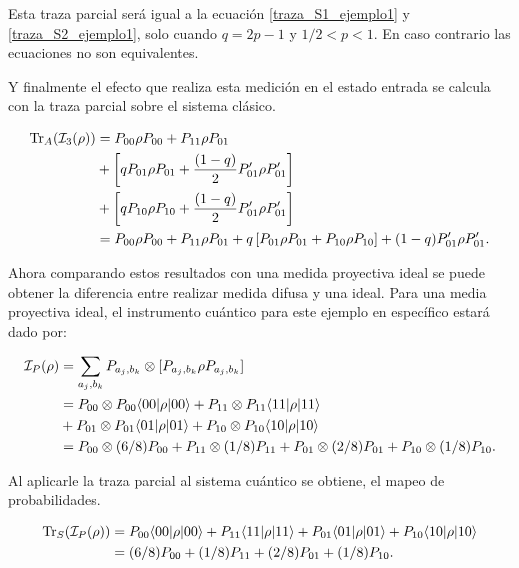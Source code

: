 Esta traza parcial será igual a la ecuación {\ref{traza_S1_ejemplo1}} y {\ref{traza_S2_ejemplo1}}, solo cuando $q=2p-1$ y $1/2<p<1$. En caso contrario las ecuaciones no son equivalentes. 

Y finalmente el efecto que realiza esta medición en el estado entrada se calcula con la traza parcial sobre el sistema clásico.


\begin{equation}\label{traza_A3_ejemplo1}
    \begin{split}
        {\rm Tr}_A(\mathcal{I}_3(\rho)) &=P_{00} \rho P_{00} + P_{11} \rho P_{01}\\
        &+\left[qP_{01}\rho P_{01}+ \frac{(1-q)}{2} P'_{01}\rho P'_{01}\right] \\
        &+\left[qP_{10}\rho P_{10}+ \frac{(1-q)}{2} P'_{01}\rho P'_{01}\right]\\
        &=P_{00} \rho P_{00} + P_{11} \rho P_{01}+q\left[P_{01}\rho P_{01}+ P_{10}\rho P_{10}\right]+{(1-q)} P'_{01}\rho P'_{01}.\\
    \end{split}
\end{equation}



Ahora comparando estos resultados con una medida proyectiva ideal se puede obtener la diferencia entre realizar medida difusa y una ideal. Para una media proyectiva ideal, el instrumento cuántico para este ejemplo en específico estará dado por:


\begin{equation}\label{proyectiva_ideal_ejemplo}
    \begin{split}
        \mathcal{I}_P(\rho)&=\sum_{a_j,b_k}P_{a_j,b_k}\otimes[P_{a_j,b_k}\rho P_{a_j,b_k}]\\
        &=P_{00}\otimes P_{00} \langle 00|\rho|00\rangle + P_{11}\otimes P_{11} \langle 11|\rho|11\rangle\\
        &+P_{01} \otimes P_{01}\langle 01|\rho|01\rangle +P_{10} \otimes P_{10} \langle 10|\rho|10\rangle\\
        &=P_{00}\otimes (6/8)P_{00} + P_{11}\otimes (1/8)P_{11}+P_{01} \otimes (2/8)P_{01} +P_{10} \otimes (1/8)P_{10}.\\
    \end{split}
\end{equation}


Al aplicarle la traza parcial al sistema cuántico se obtiene, el mapeo de probabilidades.

\begin{equation}\label{traza_SP_ejemplo1}
    \begin{split}
        {\rm Tr}_S(\mathcal{I}_P(\rho)) &= P_{00} \langle 00|\rho|00\rangle + P_{11} \langle 11|\rho|11\rangle+P_{01}\langle 01|\rho|01\rangle +P_{10} \langle 10|\rho|10\rangle\\
        &=(6/8)P_{00} + (1/8)P_{11}+(2/8)P_{01} + (1/8)P_{10}.\\
    \end{split}
\end{equation}

